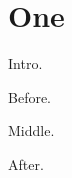 \documentclass{article}
\begin{document}
\section{One}
Intro.

\begin{minipage}{5cm}
Before.

\noindent Middle.

After.
\end{minipage}
\end{document}
